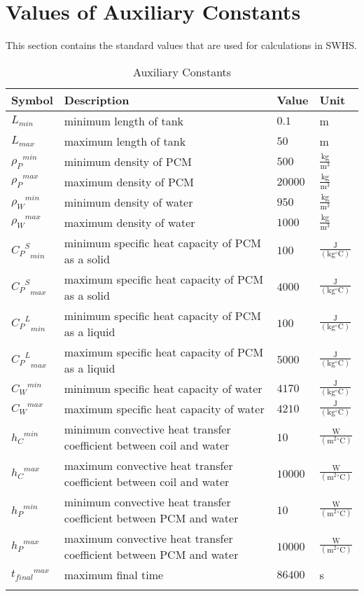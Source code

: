 \documentclass[12pt]{article}
\begin{document}
\section{Values of Auxiliary Constants}
\label{Sec:AuxConstants}
This section contains the standard values that are used for calculations in SWHS.
\begin{longtabu}{l X[l] l l}
\toprule
Symbol & Description & Value & Unit
\\
\midrule
${L_{min}}$ & minimum length of tank & $0.1$ & m
\\
${L_{max}}$ & maximum length of tank & $50$ & m
\\
${{ρ_{P}}^{min}}$ & minimum density of PCM & $500$ & $\frac{\text{kg}}{\text{m}^{3}}$
\\
${{ρ_{P}}^{max}}$ & maximum density of PCM & $20000$ & $\frac{\text{kg}}{\text{m}^{3}}$
\\
${{ρ_{W}}^{min}}$ & minimum density of water & $950$ & $\frac{\text{kg}}{\text{m}^{3}}$
\\
${{ρ_{W}}^{max}}$ & maximum density of water & $1000$ & $\frac{\text{kg}}{\text{m}^{3}}$
\\
${{{C_{P}}^{S}}_{min}}$ & minimum specific heat capacity of PCM as a solid & $100$ & $\frac{\text{J}}{(\text{kg}{}^{\circ}\text{C})}$
\\
${{{C_{P}}^{S}}_{max}}$ & maximum specific heat capacity of PCM as a solid & $4000$ & $\frac{\text{J}}{(\text{kg}{}^{\circ}\text{C})}$
\\
${{{C_{P}}^{L}}_{min}}$ & minimum specific heat capacity of PCM as a liquid & $100$ & $\frac{\text{J}}{(\text{kg}{}^{\circ}\text{C})}$
\\
${{{C_{P}}^{L}}_{max}}$ & maximum specific heat capacity of PCM as a liquid & $5000$ & $\frac{\text{J}}{(\text{kg}{}^{\circ}\text{C})}$
\\
${{C_{W}}^{min}}$ & minimum specific heat capacity of water & $4170$ & $\frac{\text{J}}{(\text{kg}{}^{\circ}\text{C})}$
\\
${{C_{W}}^{max}}$ & maximum specific heat capacity of water & $4210$ & $\frac{\text{J}}{(\text{kg}{}^{\circ}\text{C})}$
\\
${{h_{C}}^{min}}$ & minimum convective heat transfer coefficient between coil and water & $10$ & $\frac{\text{W}}{(\text{m}^{2}{}^{\circ}\text{C})}$
\\
${{h_{C}}^{max}}$ & maximum convective heat transfer coefficient between coil and water & $10000$ & $\frac{\text{W}}{(\text{m}^{2}{}^{\circ}\text{C})}$
\\
${{h_{P}}^{min}}$ & minimum convective heat transfer coefficient between PCM and water & $10$ & $\frac{\text{W}}{(\text{m}^{2}{}^{\circ}\text{C})}$
\\
${{h_{P}}^{max}}$ & maximum convective heat transfer coefficient between PCM and water & $10000$ & $\frac{\text{W}}{(\text{m}^{2}{}^{\circ}\text{C})}$
\\
${{t_{final}}^{max}}$ & maximum final time & $86400$ & s
\\
\bottomrule
\caption{Auxiliary Constants}
\label{Table:TAuxConsts}
\end{longtabu}
\end{document}
